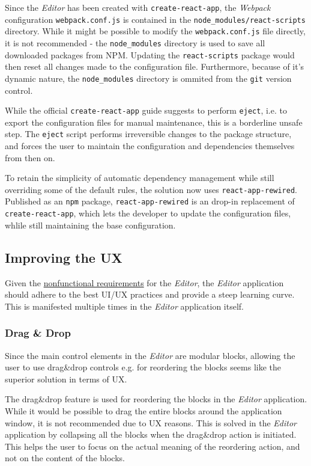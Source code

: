 Since the \textit{Editor} has been created with \texttt{create-react-app}, the \textit{Webpack} configuration \texttt{webpack.conf.js} is contained in the \verb|node_modules/react-scripts| directory.
While it might be possible to modify the \texttt{webpack.conf.js} file directly, it is not recommended - the \verb|node_modules| directory is used to save all downloaded packages from NPM.
Updating the \texttt{react-scripts} package would then reset all changes made to the configuration file.
Furthermore, because of it's dynamic nature, the \verb|node_modules| directory is ommited from the \texttt{git} version control.

While the official \texttt{create-react-app} guide suggests to perform \texttt{eject}, i.e. to export the configuration files for manual maintenance, this is a borderline unsafe step. 
The \texttt{eject} script performs irreversible changes to the package structure, and forces the user to maintain the configuration and dependencies themselves from then on.

To retain the simplicity of automatic dependency management while still overriding some of the default rules, the solution now uses \texttt{react-app-rewired}.
Published as an \texttt{npm} package, \texttt{react-app-rewired} is an drop-in replacement of \texttt{create-react-app}, which lets the developer to update the configuration files, whlile still maintaining the base configuration.

\subsection{Improving the \acs{UX}}
Given the \hyperref[requirements]{nonfunctional requirements} for the \textit{Editor}, the \textit{Editor} application should adhere to the best \ac{UI}/\ac{UX} practices and provide a steep learning curve.
This is manifested multiple times in the \textit{Editor} application itself.

\subsubsection{Drag \& Drop}
Since the main control elements in the \textit{Editor} are modular blocks, allowing the user to use drag\&drop controls e.g. for reordering the blocks seems like the superior solution in terms of UX.

The drag\&drop feature is used for reordering the blocks in the \textit{Editor} application.
While it would be possible to drag the entire blocks around the application window, it is not recommended due to UX reasons.
This is solved in the \textit{Editor} application by collapsing all the blocks when the drag\&drop action is initiated.
This helps the user to focus on the actual meaning of the reordering action, and not on the content of the blocks.

